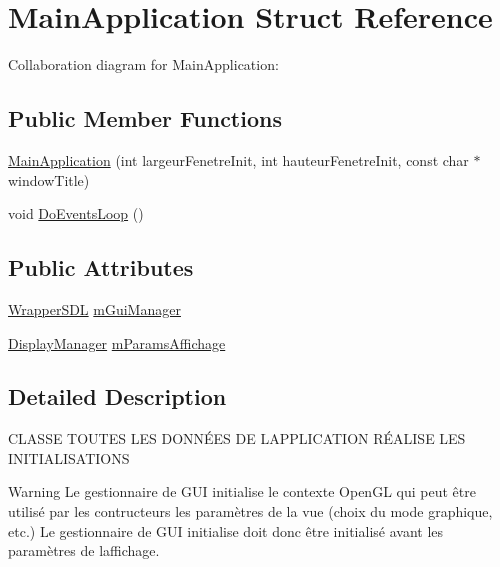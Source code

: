 \hypertarget{struct_main_application}{}\section{Main\+Application Struct Reference}
\label{struct_main_application}


Collaboration diagram for Main\+Application\+:
\subsection*{Public Member Functions}
\begin{DoxyCompactItemize}
\item 
\hyperlink{struct_main_application_ad1e259bb34972221793fefdb28967398}{Main\+Application} (int largeur\+Fenetre\+Init, int hauteur\+Fenetre\+Init, const char $\ast$window\+Title)
\item 
void \hyperlink{struct_main_application_a78dc7f7ce43e64e50eb74d1a0167aefb}{Do\+Events\+Loop} ()
\end{DoxyCompactItemize}
\subsection*{Public Attributes}
\begin{DoxyCompactItemize}
\item 
\hyperlink{struct_wrapper_s_d_l}{Wrapper\+S\+DL} \hyperlink{struct_main_application_a02a37af569312e07b3bd8f8995ef50ec}{m\+Gui\+Manager}
\item 
\hyperlink{class_display_manager}{Display\+Manager} \hyperlink{struct_main_application_a6d4bd1a7fbe48146153e7cb5082d6c15}{m\+Params\+Affichage}
\end{DoxyCompactItemize}


\subsection{Detailed Description}
C\+L\+A\+S\+SE T\+O\+U\+T\+ES L\+ES D\+O\+N\+NÉ\+ES DE L\textquotesingle{}A\+P\+P\+L\+I\+C\+A\+T\+I\+ON RÉ\+A\+L\+I\+SE L\+ES I\+N\+I\+T\+I\+A\+L\+I\+S\+A\+T\+I\+O\+NS \begin{DoxyWarning}{Warning}
Le gestionnaire de G\+UI initialise le contexte Open\+GL qui peut être utilisé par les contructeurs les paramètres de la vue (choix du mode graphique, etc.) Le gestionnaire de G\+UI initialise doit donc être initialisé avant les paramètres de l\textquotesingle{}affichage. 
\end{DoxyWarning}


